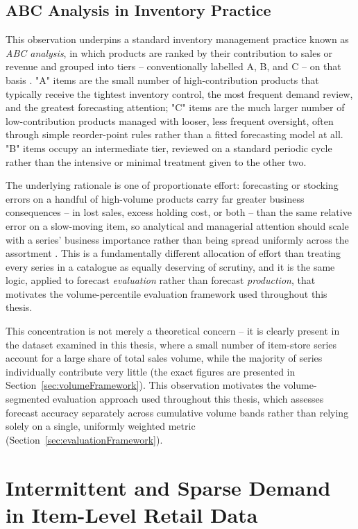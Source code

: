 \subsection{ABC Analysis in Inventory Practice}
\label{sec:abcAnalysis}

This observation underpins a standard inventory management practice known as \emph{ABC analysis}, in which products are ranked by their contribution to sales or revenue and grouped into tiers -- conventionally labelled A, B, and C -- on that basis \cite{Silver:1998}. "A" items are the small number of high-contribution products that typically receive the tightest inventory control, the most frequent demand review, and the greatest forecasting attention; "C" items are the much larger number of low-contribution products managed with looser, less frequent oversight, often through simple reorder-point rules rather than a fitted forecasting model at all. "B" items occupy an intermediate tier, reviewed on a standard periodic cycle rather than the intensive or minimal treatment given to the other two.

The underlying rationale is one of proportionate effort: forecasting or stocking errors on a handful of high-volume products carry far greater business consequences -- in lost sales, excess holding cost, or both -- than the same relative error on a slow-moving item, so analytical and managerial attention should scale with a series' business importance rather than being spread uniformly across the assortment \cite{Silver:1998}. This is a fundamentally different allocation of effort than treating every series in a catalogue as equally deserving of scrutiny, and it is the same logic, applied to forecast \emph{evaluation} rather than forecast \emph{production}, that motivates the volume-percentile evaluation framework used throughout this thesis.

This concentration is not merely a theoretical concern -- it is clearly present in the dataset examined in this thesis, where a small number of item-store series account for a large share of total sales volume, while the majority of series individually contribute very little (the exact figures are presented in Section~\ref{sec:volumeFramework}). This observation motivates the volume-segmented evaluation approach used throughout this thesis, which assesses forecast accuracy separately across cumulative volume bands rather than relying solely on a single, uniformly weighted metric (Section~\ref{sec:evaluationFramework}).

\section{Intermittent and Sparse Demand in Item-Level Retail Data}
\label{sec:intermittentDemand}


